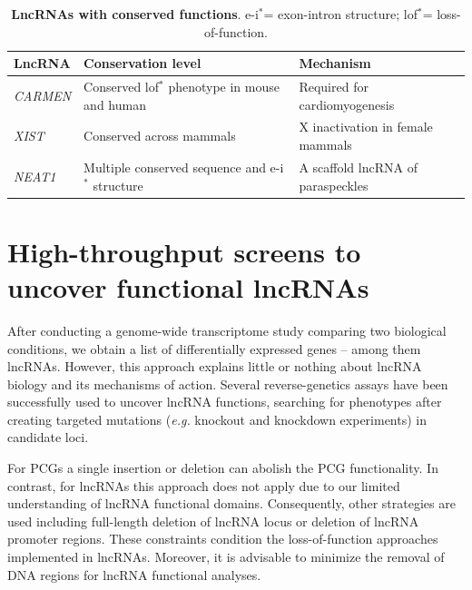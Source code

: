 \begin{table}[!htb]
  \caption[LncRNAs with conserved functions]{\textbf{LncRNAs with conserved functions}. e-i$^*$= exon-intron structure; lof$^*$= loss-of-function.}
  \begin{scriptsize}
    \begin{tabulary}{0.65\linewidth}{lll}
      \textbf{LncRNA} & \textbf{Conservation level} & \textbf{Mechanism} \\ \hline
      \textit{CARMEN}\autocite{ulitsky_2016_evolution} & Conserved lof$^*$ phenotype in mouse and human & Required for cardiomyogenesis \\
      \textit{XIST}\autocite{loda_2019_xist,ulitsky_2016_evolution} & Conserved across mammals & X inactivation in female mammals \\
      \textit{NEAT1}\autocite{ulitsky_2016_evolution,statello_2021_lncRNA_reg} & Multiple conserved sequence and e-i$^*$ structure & A scaffold lncRNA of paraspeckles \\
    \end{tabulary}
  \end{scriptsize}
  \label{tab:lncRNA-conserved-function}
\end{table}

\clearpage

\section[High-throughput screens to uncover functional lncRNAs]{High-throughput screens to uncover functional lncRNAs}
\label{sec:crispr}

After conducting a genome-wide transcriptome study comparing two biological conditions, we obtain a list of differentially expressed genes -- among them lncRNAs. However, this approach explains little or nothing about lncRNA biology and its mechanisms of action. Several reverse-genetics assays\autocite{liu_2017_crispri,Haswell_2021_crispri,liu_2020_crispri,cai_2020_crispri,liu_2020_crispri_glioma} have been successfully used to uncover lncRNA functions, searching for phenotypes after creating targeted mutations (\textit{e.g.} knockout and knockdown experiments)  in candidate loci. 

For PCGs a single insertion or deletion can abolish the PCG functionality. In contrast, for lncRNAs this approach does not apply due to our limited understanding of lncRNA functional domains. Consequently, other strategies are used including full-length deletion of lncRNA locus or deletion of lncRNA promoter regions.\autocite{perry_2016_functions,gao_2020_reverse_genetics} These constraints condition the loss-of-function approaches implemented in lncRNAs. Moreover, it is advisable to minimize the removal of DNA regions for lncRNA functional analyses.

